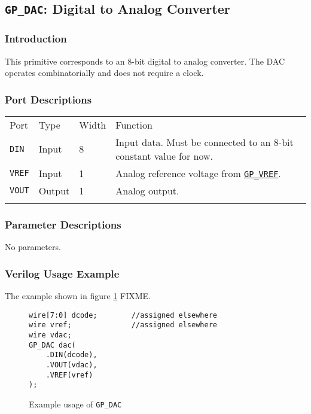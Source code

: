 \documentclass[11pt]{article}
\newcommand{\tokenstyle}[1]{\texttt{#1}}
\newcommand{\whenstyle}[1]{{\fontseries{sb}\selectfont#1}}
\newcommand{\tokenref}[2]{\hyperref[#2]{\tokenstyle{#1}}}
\newcommand{\thinhline}{\Xhline{1\arrayrulewidth}}
\newcommand{\thickhline}{\Xhline{2.5\arrayrulewidth}}
\begin{document}

\pagebreak
\subsection{\tokenstyle{GP\_DAC}: Digital to Analog Converter}
\label{gp-dac}

\subsubsection{Introduction}
This primitive corresponds to an 8-bit digital to analog converter. The DAC operates combinatorially and does not 
require a clock.

\subsubsection{Port Descriptions}

\begin{tabularx}{\textwidth}{lllX}
\thinhline
\whenstyle{Port} & \whenstyle{Type} & \whenstyle{Width} & \whenstyle{Function} \\
\thickhline
\tokenstyle{DIN} & Input & 8 & Input data. Must be connected to an 8-bit constant value for now. \\
\thinhline
\tokenstyle{VREF} & Input & 1 & Analog reference voltage from \tokenref{GP\_VREF}{gp-vref}. \\
\thinhline
\tokenstyle{VOUT} & Output & 1 & Analog output. \\
\thinhline
\end{tabularx}

\subsubsection{Parameter Descriptions}

No parameters.

\subsubsection{Verilog Usage Example}

The example shown in figure \ref{gp-dac-example} FIXME.

\begin{figure}[h]
\begin{lstlisting}
wire[7:0] dcode;		//assigned elsewhere
wire vref;				//assigned elsewhere
wire vdac;
GP_DAC dac(
	.DIN(dcode),
	.VOUT(vdac),
	.VREF(vref)
);
\end{lstlisting}
\caption{Example usage of \tokenstyle{GP\_DAC}}
\label{gp-dac-example}
\end{figure}
\end{document}
